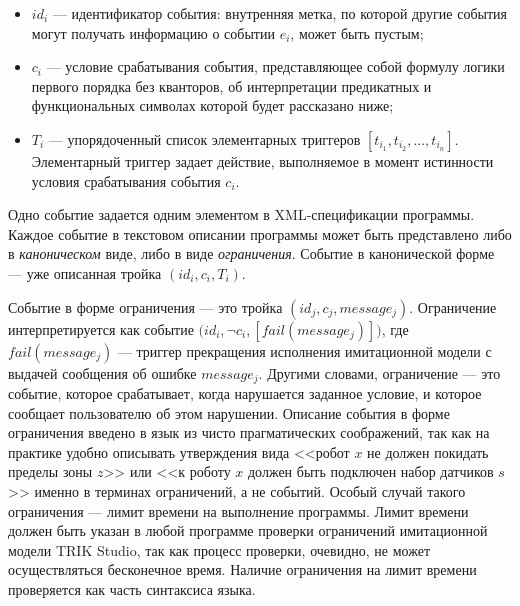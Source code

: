 \documentclass[a5paper]{article}
\begin{document}
\begin{itemize}
    \item $id_i$ --- идентификатор события: внутренняя метка, по которой другие события могут получать информацию о событии $e_i$, может быть пустым;
    \item $c_i$ --- условие срабатывания события, представляющее собой формулу логики первого порядка без кванторов, об интерпретации предикатных и функциональных символах которой будет рассказано ниже;
    \item $T_i$ --- упорядоченный список элементарных триггеров $[ t_{i_1}, t_{i_2}, ..., t_{i_n} ]$. Элементарный триггер задает действие, выполняемое в момент истинности условия срабатывания события $c_i$.
\end{itemize}

Одно событие задается одним элементом в XML-спецификации программы. Каждое событие в текстовом описании 
программы может быть представлено либо в \textit{каноническом} виде, либо в виде \textit{ограничения}. Событие в канонической форме --- уже описанная тройка $(id_i, c_i, T_i)$.

Событие в форме ограничения --- это тройка $(id_j, c_j, message_j)$. Ограничение интерпретируется как событие $(id_i, $$\neg$$c_i, [ fail(message_j) ])$, где $fail(message_j)$ --- триггер прекращения исполнения имитационной модели с выдачей сообщения об ошибке $message_j$. Другими словами, ограничение --- это событие, которое срабатывает, когда нарушается заданное условие, и которое сообщает пользователю об этом нарушении. Описание события в форме ограничения введено в язык из чисто прагматических соображений, так как на практике удобно описывать утверждения вида <<робот $x$ не должен покидать пределы зоны $z$>> или <<к роботу $x$ должен быть подключен набор датчиков $s$>> именно в терминах ограничений, а не событий. Особый случай такого ограничения --- лимит времени на выполнение программы. Лимит времени должен быть указан в любой программе проверки ограничений имитационной модели TRIK Studio, так как процесс проверки, очевидно, не может осуществляться бесконечное время. Наличие ограничения на лимит времени проверяется как часть синтаксиса языка.
\end{document}
